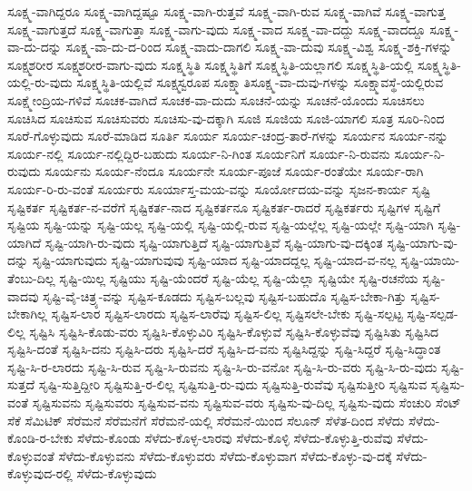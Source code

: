 {ಸೂಕ್ಷ್ಮ-ವಾಗಿದ್ದರೂ
ಸೂಕ್ಷ್ಮ-ವಾಗಿದ್ದಷ್ಟೂ
ಸೂಕ್ಷ್ಮ-ವಾಗಿ-ರುತ್ತವೆ
ಸೂಕ್ಷ್ಮ-ವಾಗಿ-ರುವ
ಸೂಕ್ಷ್ಮ-ವಾಗಿವೆ
ಸೂಕ್ಷ್ಮ-ವಾಗುತ್ತ
ಸೂಕ್ಷ್ಮ-ವಾಗುತ್ತದೆ
ಸೂಕ್ಷ್ಮ-ವಾಗುತ್ತಾ
ಸೂಕ್ಷ್ಮ-ವಾಗು-ವುದು
ಸೂಕ್ಷ್ಮ-ವಾದ
ಸೂಕ್ಷ್ಮ-ವಾ-ದದ್ದು
ಸೂಕ್ಷ್ಮ-ವಾದದ್ದೂ
ಸೂಕ್ಷ್ಮ-ವಾ-ದು-ದನ್ನು
ಸೂಕ್ಷ್ಮ-ವಾ-ದು-ದ-ರಿಂದ
ಸೂಕ್ಷ್ಮ-ವಾದು-ದಾಗಲಿ
ಸೂಕ್ಷ್ಮ-ವಾ-ದುವು
ಸೂಕ್ಷ್ಮ-ವಿಶ್ವ
ಸೂಕ್ಷ್ಮ-ಶಕ್ತಿ-ಗಳನ್ನು
ಸೂಕ್ಷ್ಮಶರೀರ
ಸೂಕ್ಷ್ಮಶರೀರ-ವಾಗು-ವುದು
ಸೂಕ್ಷ್ಮಸ್ಥಿತಿ
ಸೂಕ್ಷ್ಮಸ್ಥಿತಿಗೆ
ಸೂಕ್ಷ್ಮಸ್ಥಿತಿ-ಯಲ್ಲಾಗಲಿ
ಸೂಕ್ಷ್ಮಸ್ಥಿತಿ-ಯಲ್ಲಿ
ಸೂಕ್ಷ್ಮಸ್ಥಿತಿ-ಯಲ್ಲಿ-ರು-ವುದು
ಸೂಕ್ಷ್ಮಸ್ಥಿತಿ-ಯಲ್ಲಿವೆ
ಸೂಕ್ಷ್ಮಸ್ವರೂಪ
ಸೂಕ್ಷ್ಮಾತಿಸೂಕ್ಷ್ಮ-ವಾ-ದುವು-ಗಳನ್ನು
ಸೂಕ್ಷ್ಮಾವಸ್ಥೆ-ಯಲ್ಲಿರುವ
ಸೂಕ್ಷ್ಮೇಂದ್ರಿಯ-ಗಳಿವೆ
ಸೂಚಕ-ವಾಗಿದೆ
ಸೂಚಕ-ವಾ-ದುದು
ಸೂಚನೆ-ಯನ್ನು
ಸೂಚನೆ-ಯೊಂದು
ಸೂಚಿಸಲು
ಸೂಚಿಸಿದ
ಸೂಚಿಸುವ
ಸೂಚಿಸುವರು
ಸೂಚಿಸು-ವು-ದಕ್ಕಾಗಿ
ಸೂಜಿ
ಸೂಜಿಯ
ಸೂಜಿ-ಯಾಗಲಿ
ಸೂತ್ರ
ಸೂರಿ-ನಿಂದ
ಸೂರೆ-ಗೊಳ್ಳುವುದು
ಸೂರೆ-ಮಾಡಿದ
ಸೂರ್ತಿ
ಸೂರ್ಯ
ಸೂರ್ಯ-ಚಂದ್ರ-ತಾರೆ-ಗಳನ್ನು
ಸೂರ್ಯನ
ಸೂರ್ಯ-ನನ್ನು
ಸೂರ್ಯ-ನಲ್ಲಿ
ಸೂರ್ಯ-ನಲ್ಲಿದ್ದಿರ-ಬಹುದು
ಸೂರ್ಯ-ನಿ-ಗಿಂತ
ಸೂರ್ಯನಿಗೆ
ಸೂರ್ಯ-ನಿ-ರುವನು
ಸೂರ್ಯ-ನಿ-ರುವುದು
ಸೂರ್ಯನು
ಸೂರ್ಯ-ನೆಂದೂ
ಸೂರ್ಯನೇ
ಸೂರ್ಯ-ಪೂಜೆ
ಸೂರ್ಯ-ರಂತೆಯೇ
ಸೂರ್ಯ-ರಾಗಿ
ಸೂರ್ಯ-ರಿ-ರು-ವಂತೆ
ಸೂರ್ಯರು
ಸೂರ್ಯಾಸ್ತ-ಮಯ-ವನ್ನು
ಸೂರ್ಯೋದಯ-ವನ್ನು
ಸೃಜನ-ಕಾರ್ಯ
ಸೃಷ್ಟಿ
ಸೃಷ್ಟಿಕರ್ತ
ಸೃಷ್ಟಿಕರ್ತ-ನ-ವರೆಗೆ
ಸೃಷ್ಟಿಕರ್ತ-ನಾದ
ಸೃಷ್ಟಿಕರ್ತನೂ
ಸೃಷ್ಟಿಕರ್ತ-ರಾದರೆ
ಸೃಷ್ಟಿಕರ್ತರು
ಸೃಷ್ಟಿಗಳ
ಸೃಷ್ಟಿಗೆ
ಸೃಷ್ಟಿಯ
ಸೃಷ್ಟಿ-ಯನ್ನು
ಸೃಷ್ಟಿ-ಯಲ್ಲ
ಸೃಷ್ಟಿ-ಯಲ್ಲಿ
ಸೃಷ್ಟಿ-ಯಲ್ಲಿ-ರುವ
ಸೃಷ್ಟಿ-ಯಲ್ಲೆಲ್ಲ
ಸೃಷ್ಟಿ-ಯಲ್ಲೇ
ಸೃಷ್ಟಿ-ಯಾಗಿ
ಸೃಷ್ಟಿ-ಯಾಗಿದೆ
ಸೃಷ್ಟಿ-ಯಾಗಿ-ರು-ವುದು
ಸೃಷ್ಟಿ-ಯಾಗುತ್ತಿದೆ
ಸೃಷ್ಟಿ-ಯಾಗುತ್ತಿವೆ
ಸೃಷ್ಟಿ-ಯಾಗು-ವು-ದಕ್ಕಿಂತ
ಸೃಷ್ಟಿ-ಯಾಗು-ವು-ದನ್ನು
ಸೃಷ್ಟಿ-ಯಾಗುವುದು
ಸೃಷ್ಟಿ-ಯಾಗುವುವು
ಸೃಷ್ಟಿ-ಯಾದ
ಸೃಷ್ಟಿ-ಯಾದದ್ದಲ್ಲ
ಸೃಷ್ಟಿ-ಯಾದ-ವ-ನಲ್ಲ
ಸೃಷ್ಟಿ-ಯಾಯಿ-ತೆಂಬು-ದಿಲ್ಲ
ಸೃಷ್ಟಿ-ಯಿಲ್ಲ
ಸೃಷ್ಟಿಯು
ಸೃಷ್ಟಿ-ಯೆಂದರೆ
ಸೃಷ್ಟಿ-ಯೆಲ್ಲ
ಸೃಷ್ಟಿ-ಯೆಲ್ಲಾ
ಸೃಷ್ಟಿಯೇ
ಸೃಷ್ಟಿ-ರಚನೆಯ
ಸೃಷ್ಟಿ-ವಾದವು
ಸೃಷ್ಟಿ-ವೈ-ಚಿತ್ರ್ಯ-ವನ್ನು
ಸೃಷ್ಟಿಸ-ಕೂಡದು
ಸೃಷ್ಟಿಸ-ಬಲ್ಲವು
ಸೃಷ್ಟಿಸ-ಬಹುದೊ
ಸೃಷ್ಟಿಸ-ಬೇಕಾ-ಗಿತ್ತು
ಸೃಷ್ಟಿಸ-ಬೇಕಾಗಿಲ್ಲ
ಸೃಷ್ಟಿಸ-ಲಾರ
ಸೃಷ್ಟಿಸ-ಲಾರದು
ಸೃಷ್ಟಿಸ-ಲಾರೆವು
ಸೃಷ್ಟಿಸ-ಲಿಲ್ಲ
ಸೃಷ್ಟಿಸಲೇ-ಬೇಕು
ಸೃಷ್ಟಿ-ಸಲ್ಪಟ್ಟ
ಸೃಷ್ಟಿ-ಸಲ್ಪಡ-ಲಿಲ್ಲ
ಸೃಷ್ಟಿಸಿ
ಸೃಷ್ಟಿಸಿ-ಕೊಡು-ವರು
ಸೃಷ್ಟಿಸಿ-ಕೊಳ್ಳುವಿರಿ
ಸೃಷ್ಟಿಸಿ-ಕೊಳ್ಳುವೆ
ಸೃಷ್ಟಿಸಿ-ಕೊಳ್ಳುವೆವು
ಸೃಷ್ಟಿಸಿತು
ಸೃಷ್ಟಿಸಿದ
ಸೃಷ್ಟಿಸಿ-ದಂತೆ
ಸೃಷ್ಟಿಸಿ-ದನು
ಸೃಷ್ಟಿಸಿ-ದರು
ಸೃಷ್ಟಿಸಿ-ದರೆ
ಸೃಷ್ಟಿಸಿ-ದ-ವನು
ಸೃಷ್ಟಿಸಿದ್ದನ್ನು
ಸೃಷ್ಟಿ-ಸಿದ್ದರೆ
ಸೃಷ್ಟಿ-ಸಿದ್ಧಾಂತ
ಸೃಷ್ಟಿ-ಸಿ-ರ-ಲಾರದು
ಸೃಷ್ಟಿ-ಸಿ-ರುವ
ಸೃಷ್ಟಿ-ಸಿ-ರುವನು
ಸೃಷ್ಟಿ-ಸಿ-ರು-ವನೋ
ಸೃಷ್ಟಿ-ಸಿ-ರು-ವರು
ಸೃಷ್ಟಿ-ಸಿ-ರು-ವುದು
ಸೃಷ್ಟಿ-ಸುತ್ತದೆ
ಸೃಷ್ಟಿ-ಸುತ್ತಿದ್ದೀರಿ
ಸೃಷ್ಟಿಸುತ್ತಿ-ರ-ಲಿಲ್ಲ
ಸೃಷ್ಟಿಸುತ್ತಿ-ರು-ವುದು
ಸೃಷ್ಟಿಸುತ್ತಿ-ರುವೆವು
ಸೃಷ್ಟಿಸುತ್ತೀರಿ
ಸೃಷ್ಟಿಸುವ
ಸೃಷ್ಟಿಸು-ವಂತೆ
ಸೃಷ್ಟಿಸುವನು
ಸೃಷ್ಟಿಸುವರು
ಸೃಷ್ಟಿಸುವ-ವನು
ಸೃಷ್ಟಿಸುವ-ವರು
ಸೃಷ್ಟಿಸು-ವು-ದಿಲ್ಲ
ಸೃಷ್ಟಿಸು-ವುದು
ಸೆಂಚುರಿ
ಸೆಂಟ್
ಸೆಕೆ
ಸೆಮಿಟಿಕ್
ಸೆರೆಮನೆ
ಸೆರೆಮನೆಗೆ
ಸೆರೆಮನೆ-ಯಲ್ಲಿ
ಸೆರೆಮನೆ-ಯಿಂದ
ಸೆಲೂನ್
ಸೆಳೆತ-ದಿಂದ
ಸೆಳೆದು
ಸೆಳೆದು-ಕೊಂಡಿ-ರ-ಬೇಕು
ಸೆಳೆದು-ಕೊಂಡು
ಸೆಳೆದು-ಕೊಳ್ಳ-ಲಾರವು
ಸೆಳೆದು-ಕೊಳ್ಳಿ
ಸೆಳೆದು-ಕೊಳ್ಳುತ್ತಿ-ರುವೆವು
ಸೆಳೆದು-ಕೊಳ್ಳುವಂತೆ
ಸೆಳೆದು-ಕೊಳ್ಳುವನು
ಸೆಳೆದು-ಕೊಳ್ಳುವರು
ಸೆಳೆದು-ಕೊಳ್ಳುವಾಗ
ಸೆಳೆದು-ಕೊಳ್ಳು-ವು-ದಕ್ಕೆ
ಸೆಳೆದು-ಕೊಳ್ಳುವುದ-ರಲ್ಲಿ
ಸೆಳೆದು-ಕೊಳ್ಳುವುದು
}
